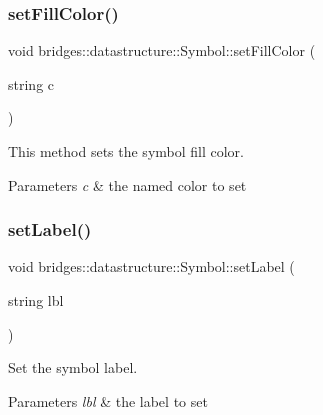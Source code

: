 \subsubsection{\texorpdfstring{set\+Fill\+Color()}{setFillColor()}\hspace{0.1cm}{\footnotesize\ttfamily [2/2]}}
{\footnotesize\ttfamily void bridges\+::datastructure\+::\+Symbol\+::set\+Fill\+Color (\begin{DoxyParamCaption}\item[{string}]{c }\end{DoxyParamCaption})\hspace{0.3cm}{\ttfamily [inline]}}



This method sets the symbol fill color. 


\begin{DoxyParams}{Parameters}
{\em c} & the named color to set \\
\hline
\end{DoxyParams}
\mbox{\label{classbridges_1_1datastructure_1_1_symbol_a34609dd22e5043c39d40524d05e337b0}} 
\subsubsection{\texorpdfstring{set\+Label()}{setLabel()}}
{\footnotesize\ttfamily void bridges\+::datastructure\+::\+Symbol\+::set\+Label (\begin{DoxyParamCaption}\item[{string}]{lbl }\end{DoxyParamCaption})\hspace{0.3cm}{\ttfamily [inline]}}



Set the symbol label. 


\begin{DoxyParams}{Parameters}
{\em lbl} & the label to set \\
\hline
\end{DoxyParams}
\mbox{\label{classbridges_1_1datastructure_1_1_symbol_a9c62675b598fc5e755721576852f2dcf}} 
